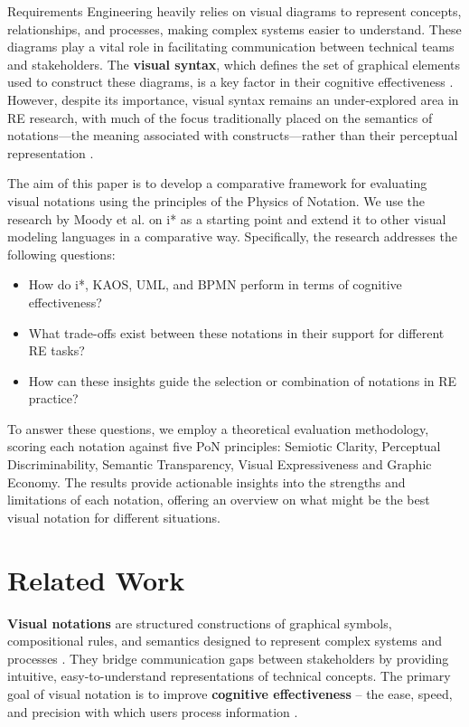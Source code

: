 \documentclass[runningheads]{llncs}
\begin{document}
Requirements Engineering heavily relies on visual diagrams to represent concepts, relationships, and processes, making complex systems easier to understand. These diagrams play a vital role in facilitating communication between technical teams and stakeholders.\cite{Yu1997} The \textbf{visual syntax}, which defines the set of graphical elements used to construct these diagrams, is a key factor in their cognitive effectiveness \cite{Moody2010}. However, despite its importance, visual syntax remains an under-explored area in RE research, with much of the focus traditionally placed on the semantics of notations---the meaning associated with constructs---rather than their perceptual representation \cite{Moody2010}.

The aim of this paper is to develop a comparative framework for evaluating visual notations using the principles of the Physics of Notation. We use the research by Moody et al. \cite{Moody2010} on i* as a starting point and extend it to other visual modeling languages in a comparative way. Specifically, the research addresses the following questions:
\begin{itemize}
    \item How do i*, KAOS, UML, and BPMN perform in terms of cognitive effectiveness?
    \item What trade-offs exist between these notations in their support for different RE tasks?
    \item How can these insights guide the selection or combination of notations in RE practice?
\end{itemize}
    
To answer these questions, we employ a theoretical evaluation methodology, scoring each notation against five PoN principles: Semiotic Clarity, Perceptual Discriminability, Semantic Transparency, Visual Expressiveness and Graphic Economy. The results provide actionable insights into the strengths and limitations of each notation, offering an overview on what might be the best visual notation for different situations.



\section{Related Work}
\textbf{Visual notations} are structured constructions of graphical symbols, compositional rules, and semantics designed to represent complex systems and processes \cite{ElGhafar2014, Moody2010}. They bridge communication gaps between stakeholders by providing intuitive, easy-to-understand representations of technical concepts. The primary goal of visual notation is to improve\textbf{ cognitive effectiveness} -- the ease, speed, and precision with which users process information \cite{Moody2010}. 
\end{document}
